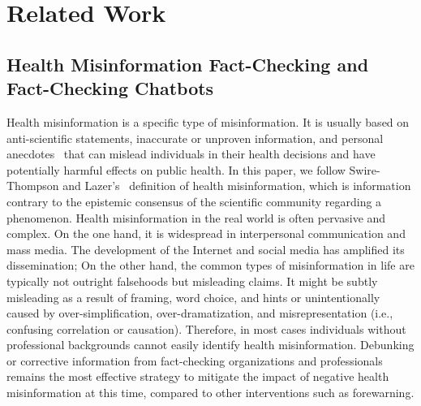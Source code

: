 \section{Related Work}
\subsection{Health Misinformation Fact-Checking and Fact-Checking Chatbots}
Health misinformation is a specific type of misinformation. It is usually based on anti-scientific statements, inaccurate or unproven
information, and personal anecdotes~\cite[]{teoh2019power,qi2016misinformation}  that can mislead individuals in their health decisions and have potentially harmful effects on public health.
In this paper, we follow Swire-Thompson and Lazer's~\cite[]{swire2019public} definition of health misinformation, which is information contrary to the epistemic consensus of the scientific community regarding a phenomenon.
Health misinformation in the real world is often pervasive and complex. 
On the one hand, it is widespread in interpersonal communication\cite[]{difonzo2012rumors} and mass media\cite[]{southwell2015prevalence}.
The development of the Internet and social media has amplified its dissemination\cite[]{southwell2015prevalence}; 
On the other hand, the common types of misinformation in life are typically not outright falsehoods but misleading claims\cite[]{al2018drug}. It might be subtly misleading as a result of framing, word choice, and hints\cite[]{ecker2014effects} or unintentionally caused by over-simplification, over-dramatization, and misrepresentation (i.e., confusing correlation or causation)\cite[]{lewandowsky2012misinformation}.
Therefore, in most cases individuals without professional backgrounds cannot easily identify health misinformation.
Debunking or corrective information from fact-checking organizations and professionals remains the most effective strategy to mitigate the impact of negative health misinformation at this time, compared to other interventions such as forewarning\cite[]{walter2018unring,walter2020meta,porter2021global}.

